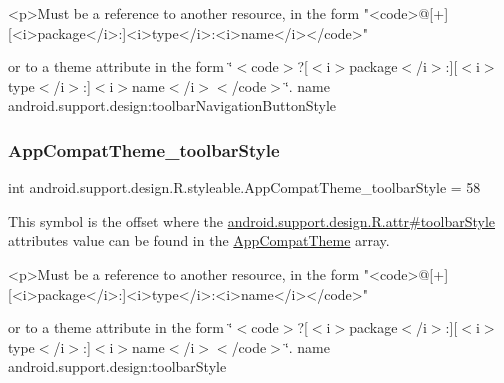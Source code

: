 \begin{DoxyVerb}      <p>Must be a reference to another resource, in the form "<code>@[+][<i>package</i>:]<i>type</i>:<i>name</i></code>"
\end{DoxyVerb}
 or to a theme attribute in the form \char`\"{}$<$code$>$?\mbox{[}$<$i$>$package$<$/i$>$\+:\mbox{]}\mbox{[}$<$i$>$type$<$/i$>$\+:\mbox{]}$<$i$>$name$<$/i$>$$<$/code$>$\char`\"{}.  name android.\+support.\+design\+:toolbar\+Navigation\+Button\+Style \mbox{\label{classandroid_1_1support_1_1design_1_1R_1_1styleable_aee082e81065a0dcd55b2dac5cf28624e}} 
\subsubsection{\texorpdfstring{App\+Compat\+Theme\+\_\+toolbar\+Style}{AppCompatTheme\_toolbarStyle}}
{\footnotesize\ttfamily int android.\+support.\+design.\+R.\+styleable.\+App\+Compat\+Theme\+\_\+toolbar\+Style = 58\hspace{0.3cm}{\ttfamily [static]}}

This symbol is the offset where the \hyperlink{classandroid_1_1support_1_1design_1_1R_1_1attr_a75b98851c40a539d3c8cba7e8429a3e4}{android.\+support.\+design.\+R.\+attr\#toolbar\+Style} attribute\textquotesingle{}s value can be found in the \hyperlink{classandroid_1_1support_1_1design_1_1R_1_1styleable_afb351dc8de20cbd4c89abe360373010c}{App\+Compat\+Theme} array.

\begin{DoxyVerb}      <p>Must be a reference to another resource, in the form "<code>@[+][<i>package</i>:]<i>type</i>:<i>name</i></code>"
\end{DoxyVerb}
 or to a theme attribute in the form \char`\"{}$<$code$>$?\mbox{[}$<$i$>$package$<$/i$>$\+:\mbox{]}\mbox{[}$<$i$>$type$<$/i$>$\+:\mbox{]}$<$i$>$name$<$/i$>$$<$/code$>$\char`\"{}.  name android.\+support.\+design\+:toolbar\+Style \mbox{\label{classandroid_1_1support_1_1design_1_1R_1_1styleable_af0d7fc989412d347b42efaf6e07fb775}} 
